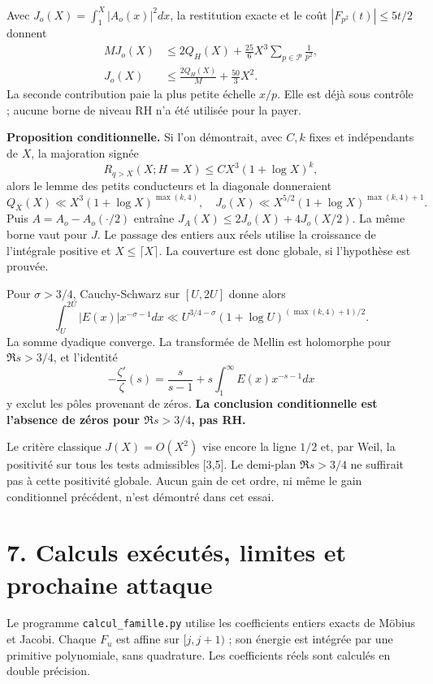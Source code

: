 \documentclass[
  11pt,
  a4paper,
]{article}
\begin{document}
Avec \(J_o(X)=\int_1^X|A_o(x)|^2dx\), la restitution exacte et le coût
\(|F_{p^2}(t)|\le5t/2\) donnent \[
\begin{aligned}
M J_o(X)
&\le 2Q_H(X)+\frac{25}{6}X^3\sum_{p\in\mathcal P}\frac1{p^2},\\
J_o(X)&\le\frac{2Q_H(X)}M+\frac{50}{3}X^2.
\end{aligned}
\] La seconde contribution paie la plus petite échelle \(x/p\). Elle est
déjà sous contrôle ; aucune borne de niveau RH n'a été utilisée pour la
payer.

\textbf{Proposition conditionnelle.} Si l'on démontrait, avec \(C,k\)
fixes et indépendants de \(X\), la majoration signée \[
\boxed{R_{q>X}(X;H=X)\le C X^3(1+\log X)^k,}
\] alors le lemme des petits conducteurs et la diagonale donneraient \[
Q_X(X)\ll X^3(1+\log X)^{\max(k,4)},\quad
J_o(X)\ll X^{5/2}(1+\log X)^{\max(k,4)+1}.
\] Puis \(A=A_o-A_o(\cdot/2)\) entraîne \(J_A(X)\le2J_o(X)+4J_o(X/2)\).
La même borne vaut pour \(J\). Le passage des entiers aux réels utilise
la croissance de l'intégrale positive et \(X\le\lceil X\rceil\). La
couverture est donc globale, si l'hypothèse est prouvée.

Pour \(\sigma>3/4\), Cauchy-Schwarz sur \([U,2U]\) donne alors \[
\int_U^{2U}|E(x)|x^{-\sigma-1}dx
\ll U^{3/4-\sigma}(1+\log U)^{(\max(k,4)+1)/2}.
\] La somme dyadique converge. La transformée de Mellin est holomorphe
pour \(\Re s>3/4\), et l'identité \[
-\frac{\zeta'}{\zeta}(s)=\frac{s}{s-1}
+s\int_1^\infty E(x)x^{-s-1}dx
\] y exclut les pôles provenant de zéros. \textbf{La conclusion
conditionnelle est l'absence de zéros pour \(\Re s>3/4\), pas RH.}

Le critère classique \(J(X)=O(X^2)\) vise encore la ligne \(1/2\) et,
par Weil, la positivité sur tous les tests admissibles {[}3,5{]}. Le
demi-plan \(\Re s>3/4\) ne suffirait pas à cette positivité globale.
Aucun gain de cet ordre, ni même le gain conditionnel précédent, n'est
démontré dans cet essai.

\newpage

\hypertarget{calculs-exuxe9cutuxe9s-limites-et-prochaine-attaque}{%
\section{7. Calculs exécutés, limites et prochaine
attaque}\label{calculs-exuxe9cutuxe9s-limites-et-prochaine-attaque}}

Le programme \texttt{calcul\_famille.py} utilise les coefficients
entiers exacts de Möbius et Jacobi. Chaque \(F_u\) est affine sur
\([j,j+1)\) ; son énergie est intégrée par une primitive polynomiale,
sans quadrature. Les coefficients réels sont calculés en double
précision.
\end{document}
